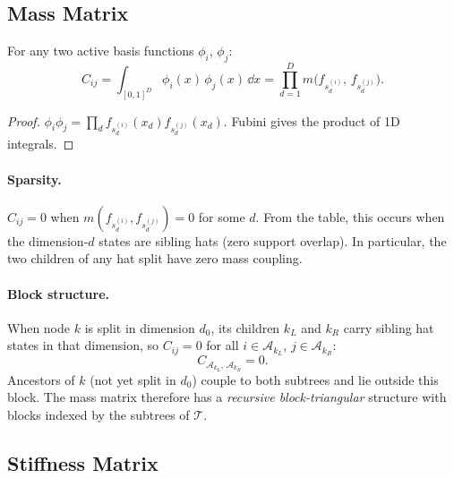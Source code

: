 \documentclass[11pt]{article}
\begin{document}
\subsection{Mass Matrix}
\label{sec:hat-mass}

\begin{proposition}
\label{prop:mass-new}
For any two active basis functions $\phi_i$, $\phi_j$:
\begin{equation}
  C_{ij} = \int_{[0,1]^D} \phi_i(x)\,\phi_j(x)\,\dd x
          = \prod_{d=1}^D m\!\bigl(f_{s_d^{(i)}},\, f_{s_d^{(j)}}\bigr).
  \label{eq:hat-mass-new}
\end{equation}
\end{proposition}
\begin{proof}
$\phi_i\phi_j = \prod_d f_{s_d^{(i)}}(x_d)f_{s_d^{(j)}}(x_d)$.
Fubini gives the product of 1D integrals.
\end{proof}

\paragraph{Sparsity.}
$C_{ij} = 0$ when $m(f_{s_d^{(i)}},f_{s_d^{(j)}})=0$ for some $d$.
From the table, this occurs when the dimension-$d$ states are sibling hats
(zero support overlap).  In particular, the two children of any hat split
have zero mass coupling.

\paragraph{Block structure.}
When node $k$ is split in dimension $d_0$, its children $k_L$ and $k_R$
carry sibling hat states in that dimension, so $C_{ij} = 0$ for all
$i\in\mathcal{A}_{k_L}$, $j\in\mathcal{A}_{k_R}$:
\begin{equation}
  C_{\mathcal{A}_{k_L},\,\mathcal{A}_{k_R}} = 0.
  \label{eq:C-block-zero}
\end{equation}
Ancestors of $k$ (not yet split in $d_0$) couple to both subtrees and lie
outside this block.  The mass matrix therefore has a \emph{recursive
block-triangular} structure with blocks indexed by the subtrees of $\mathcal{T}$.

\subsection{Stiffness Matrix}
\label{sec:hat-stiffness}
\end{document}
